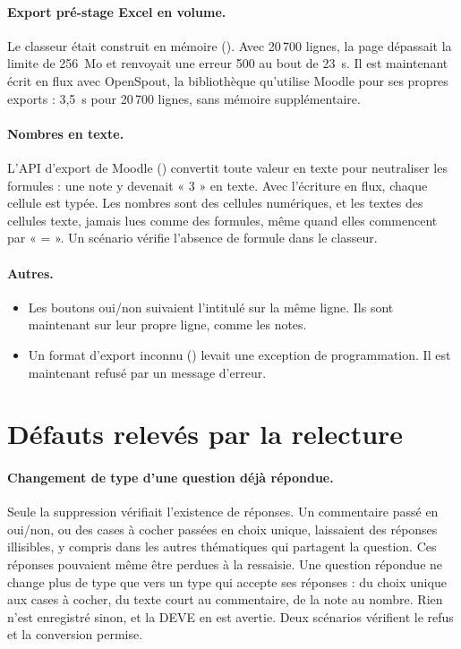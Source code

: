 \documentclass[11pt,a4paper]{article}
\newcommand{\grav}[1]{\textbf{\textcolor{#1}{\textbullet}}}
\newcommand{\maj}{\grav{orange}}
\newcommand{\mineure}{\grav{gray}}
\begin{document}
\paragraph{\maj{} Export pré-stage Excel en volume.} Le classeur était construit en mémoire
(). Avec 20\,700 lignes, la page dépassait la limite de 256~Mo et
renvoyait une erreur 500 au bout de 23~s. Il est maintenant écrit en flux avec OpenSpout, la
bibliothèque qu'utilise Moodle pour ses propres exports : 3,5~s pour 20\,700 lignes, sans
mémoire supplémentaire.

\paragraph{\mineure{} Nombres en texte.} L'API d'export de Moodle () convertit
toute valeur en texte pour neutraliser les formules : une note y devenait « 3 » en texte. Avec
l'écriture en flux, chaque cellule est typée. Les nombres sont des cellules numériques, et les
textes des cellules texte, jamais lues comme des formules, même quand elles commencent par
« = ». Un scénario vérifie l'absence de formule dans le classeur.

\paragraph{\mineure{} Autres.}
\begin{itemize}
  \item Les boutons oui/non suivaient l'intitulé sur la même ligne. Ils sont maintenant sur leur
    propre ligne, comme les notes.
  \item Un format d'export inconnu () levait une exception de
    programmation. Il est maintenant refusé par un message d'erreur.
\end{itemize}

\section{Défauts relevés par la relecture}

\paragraph{\maj{} Changement de type d'une question déjà répondue.} Seule la suppression
vérifiait l'existence de réponses. Un commentaire passé en oui/non, ou des cases à cocher passées
en choix unique, laissaient des réponses illisibles, y compris dans les autres thématiques qui
partagent la question. Ces réponses pouvaient même être perdues à la ressaisie. Une question
répondue ne change plus de type que vers un type qui accepte ses réponses : du choix unique aux
cases à cocher, du texte court au commentaire, de la note au nombre. Rien n'est enregistré
sinon, et la DEVE en est avertie. Deux scénarios vérifient le refus et la conversion permise.
\end{document}
